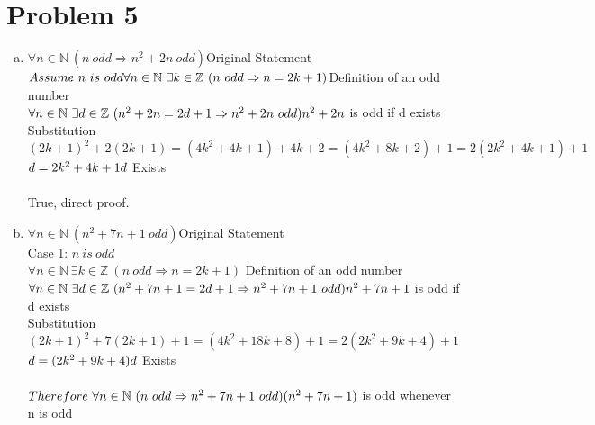 \documentclass[11pt,letterpaper]{article}
\begin{document}
\clearpage

\section*{Problem 5}
\begin{enumerate}[(a)]
\item
$\forall n\in\mathbb{N}~(n~odd \Rightarrow n^2 + 2n~odd)$\hfill Original Statement\\
$Assume~n~is~odd\\
\forall n\in\mathbb{N}~\exists k\in\mathbb{Z}~(n~odd\Rightarrow n=2k+1)$\hfill Definition of an odd number\\
$\forall n\in\mathbb{N}~\exists d\in\mathbb{Z}~(n^2+2n = 2d+1 \Rightarrow n^2+2n~odd)\hfill n^2+2n$ is odd if d exists\\
Substitution\\
$(2k+1)^2 + 2(2k+1) = (4k^2 + 4k +1)+4k +2 = (4k^2 +8k + 2) + 1 = 2(2k^2 + 4k +1) + 1$\\
$d=2k^2 +4k +1\hfill d$ Exists\\
\\
True, direct proof.
\\
\item
$\forall n\in\mathbb{N}~(n^2 +7n +1~odd)$\hfill Original Statement\\
Case 1: $n~is~odd$\\
$\forall n\in\mathbb{N}~\exists k\in\mathbb{Z}~(n~odd\Rightarrow n =2k+1)$ \hfill Definition of an odd number\\
$\forall n\in\mathbb{N}~\exists d\in\mathbb{Z}~(n^2+7n+1 = 2d+1 \Rightarrow n^2+7n+1~odd)\hfill n^2+7n+1$ is odd if d exists\\
Substitution\\
$(2k+1)^2 + 7(2k+1) + 1 = (4k^2 + 18k +8) + 1 = 2(2k^2 + 9k + 4) + 1$\\
$d = (2k^2 + 9k + 4)\hfill d$ Exists\\
\\
$Therefore~\forall n\in\mathbb{N}~(n~odd\Rightarrow n^2 +7n +1~odd)\hfill (n^2 +7n +1)$ is odd whenever n is odd\\


\end{enumerate}
\end{document}
